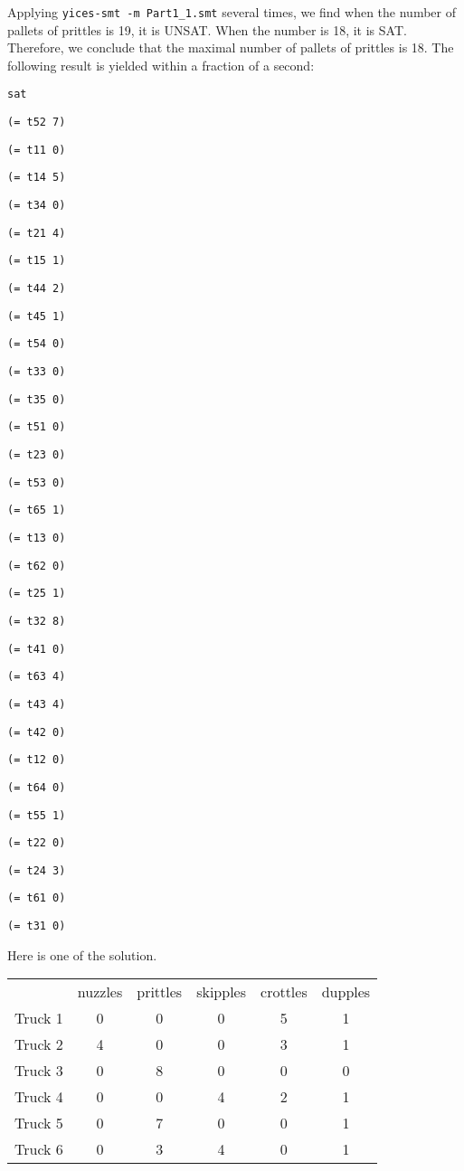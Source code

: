 \documentclass[11pt]{article}
\begin{document}
Applying {\tt yices-smt -m Part1\_1.smt} several times, we find when the number of pallets of prittles is 19, it is UNSAT. When the number is 18, it is SAT. Therefore, we conclude that the maximal number of pallets of prittles is 18.
The following result is yielded within a fraction of a second:

{\footnotesize

{\tt sat}

{\tt (= t52 7)}

{\tt (= t11 0)}

{\tt (= t14 5)}

{\tt (= t34 0)}

{\tt (= t21 4)}

{\tt (= t15 1)}

{\tt (= t44 2)}

{\tt (= t45 1)}

{\tt (= t54 0)}

{\tt (= t33 0)}

{\tt (= t35 0)}

{\tt (= t51 0)}

{\tt (= t23 0)}

{\tt (= t53 0)}

{\tt (= t65 1)}

{\tt (= t13 0)}

{\tt (= t62 0)}

{\tt (= t25 1)}

{\tt (= t32 8)}

{\tt (= t41 0)}

{\tt (= t63 4)}

{\tt (= t43 4)}

{\tt (= t42 0)}

{\tt (= t12 0)}

{\tt (= t64 0)}

{\tt (= t55 1)}

{\tt (= t22 0)}

{\tt (= t24 3)}

{\tt (= t61 0)}

{\tt (= t31 0)}

}
\vspace{3mm}
Here is one of the solution.

\vspace{2mm}
  \begin{center}
  \begin{tabular}{|l|c|c|c|c|c|}
    \hline
     & nuzzles & prittles & skipples & crottles & dupples \\
    Truck 1 & 0 & 0 & 0 & 5 & 1 \\
    Truck 2 & 4 & 0 & 0 & 3 & 1 \\
    Truck 3 & 0 & 8 & 0 & 0 & 0 \\
    Truck 4 & 0 & 0 & 4 & 2 & 1 \\
    Truck 5 & 0 & 7 & 0 & 0 & 1 \\
    Truck 6 & 0 & 3 & 4 & 0 & 1 \\
    \hline
  \end{tabular}
\end{center}
\end{document}
